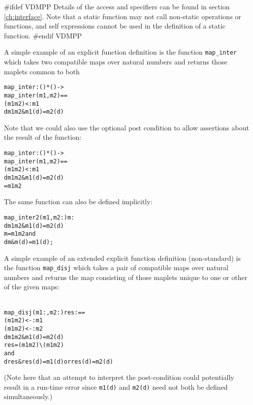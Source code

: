 \documentclass[\pformat,12pt]{article}
\begin{document}
#ifdef VDMPP
Details of the access and  specifiers can be found in
section \ref{ch:interface}. Note that a static function may not call
non-static operations or functions, and self expressions cannot be
used in the definition of a static function.
#endif VDMPP

A simple example of an explicit function definition is the function
\texttt{map\_inter} which takes two compatible maps over natural
numbers and returns those maplets common to both
\begin{alltt}
  map_inter: () * () -> 
  map_inter (m1,m2) ==
    ( m1   m2) <: m1
    d  m1  m2 & m1(d) = m2(d)
\end{alltt}
Note that we could also use the optional post condition to allow
assertions about the result of the function:
\begin{alltt}
  map_inter: () * () -> 
  map_inter (m1,m2) ==
    ( m1   m2) <: m1
    d  m1  m2 & m1(d) = m2(d)
     =  m1   m2
\end{alltt}

The same function can also be defined implicitly:
\begin{alltt}
  map_inter2 (m1,m2: ) m: 
    d  m1  m2 & m1(d) = m2(d)
    m =  m1  m2 and
        d  m & m(d) = m1(d);
\end{alltt}

A simple example of an extended explicit function definition
(non-standard) is the function \texttt{map\_disj} which takes a pair of
compatible maps over natural numbers and returns the map consisting of
those maplets unique to one or other of the given maps:

\begin{alltt}\label{mapdisj}
  map_disj (m1:,m2:) res :  ==
    ( m1  m2) <-: m1 
    ( m1  m2) <-: m2
    d  m1  m2 & m1(d) = m2(d)
    res = ( m1  m2) \verb+\+ ( m1  m2) 
       and
        d  res & res(d) = m1(d) or res(d) = m2(d)
\end{alltt}
(Note here that an attempt to interpret the post-condition could
potentially result in a run-time error since \texttt{m1(d)} and
\texttt{m2(d)} need not both be defined simultaneously.)
\end{document}
